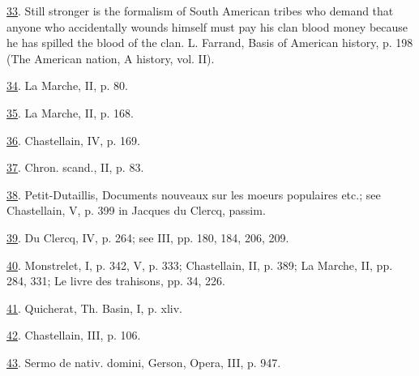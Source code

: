 \protect\hypertarget{23_NOTES.xhtmlux5cux23id_568}{\protect\hyperlink{18_Chapter_Eleven__THE_FORMS_OF_THO.xhtmlux5cux23id_567}{33}}.
Still stronger is the formalism of South American tribes who demand that
anyone who accidentally wounds himself must pay his clan blood money
because he has spilled the blood of the clan. L. Farrand, Basis of
American history, p. 198 (The American nation, A history, vol. II).

\protect\hypertarget{23_NOTES.xhtmlux5cux23id_566}{\protect\hyperlink{18_Chapter_Eleven__THE_FORMS_OF_THO.xhtmlux5cux23id_565}{34}}.
La Marche, II, p. 80.

\protect\hypertarget{23_NOTES.xhtmlux5cux23id_564}{\protect\hyperlink{18_Chapter_Eleven__THE_FORMS_OF_THO.xhtmlux5cux23id_563}{35}}.
La Marche, II, p. 168.

\protect\hypertarget{23_NOTES.xhtmlux5cux23id_562}{\protect\hyperlink{18_Chapter_Eleven__THE_FORMS_OF_THO.xhtmlux5cux23id_561}{36}}.
Chastellain, IV, p. 169.

\protect\hypertarget{23_NOTES.xhtmlux5cux23id_560}{\protect\hyperlink{18_Chapter_Eleven__THE_FORMS_OF_THO.xhtmlux5cux23id_559}{37}}.
Chron. scand., II, p. 83.

\protect\hypertarget{23_NOTES.xhtmlux5cux23id_558}{\protect\hyperlink{18_Chapter_Eleven__THE_FORMS_OF_THO.xhtmlux5cux23id_557}{38}}.
Petit-Dutaillis, Documents nouveaux sur les moeurs populaires etc.; see
Chastellain, V, p. 399 in Jacques du Clercq, passim.

\protect\hypertarget{23_NOTES.xhtmlux5cux23id_556}{\protect\hyperlink{18_Chapter_Eleven__THE_FORMS_OF_THO.xhtmlux5cux23id_555}{39}}.
Du Clercq, IV, p. 264; see III, pp. 180, 184, 206, 209.

\protect\hypertarget{23_NOTES.xhtmlux5cux23id_554}{\protect\hyperlink{18_Chapter_Eleven__THE_FORMS_OF_THO.xhtmlux5cux23id_553}{40}}.
Monstrelet, I, p. 342, V, p. 333; Chastellain, II, p. 389; La Marche,
II, pp. 284, 331; Le livre des trahisons, pp. 34, 226.

\protect\hypertarget{23_NOTES.xhtmlux5cux23id_552}{\protect\hyperlink{18_Chapter_Eleven__THE_FORMS_OF_THO.xhtmlux5cux23id_551}{41}}.
Quicherat, Th. Basin, I, p. xliv.

\protect\hypertarget{23_NOTES.xhtmlux5cux23id_550}{\protect\hyperlink{18_Chapter_Eleven__THE_FORMS_OF_THO.xhtmlux5cux23id_549}{42}}.
Chastellain, III, p. 106.

\protect\hypertarget{23_NOTES.xhtmlux5cux23id_548}{\protect\hyperlink{18_Chapter_Eleven__THE_FORMS_OF_THO.xhtmlux5cux23id_547}{43}}.
Sermo de nativ. domini, Gerson, Opera, III, p. 947.

